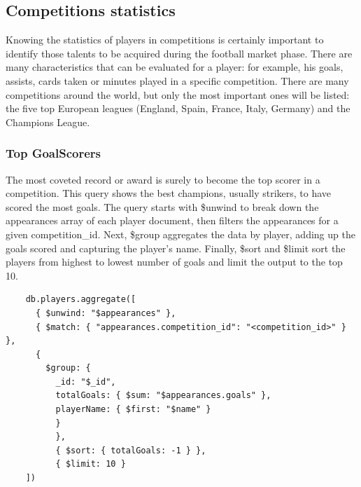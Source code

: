 \documentclass{Configuration_Files/PoliMi3i_thesis}
\begin{document}
\subsection{Competitions statistics}
Knowing the statistics of players in competitions is certainly important to identify those talents to be acquired during the football market phase. There are many characteristics that can be evaluated for a player: for example, his goals, assists, cards taken or minutes played in a specific competition.
There are many competitions around the world, but only the most important ones will be listed: the five top European leagues (England, Spain, France, Italy, Germany) and the Champions League.
\subsubsection{Top GoalScorers}
The most coveted record or award is surely to become the top scorer in a competition. This query shows the best champions, usually strikers, to have scored the most goals.
The query starts with \$unwind to break down the appearances array of each player document, then filters the appearances for a given competition\_id. Next, \$group aggregates the data by player, adding up the goals scored and capturing the player's name. Finally, \$sort and \$limit sort the players from highest to lowest number of goals and limit the output to the top 10. 
\begin{verbatim}
    db.players.aggregate([
      { $unwind: "$appearances" },
      { $match: { "appearances.competition_id": "<competition_id>" } },
      {
        $group: {
          _id: "$_id",
          totalGoals: { $sum: "$appearances.goals" },
          playerName: { $first: "$name" }
          }
          },
          { $sort: { totalGoals: -1 } },
          { $limit: 10 }
    ])
    
\end{verbatim}
\newpage
\end{document}
